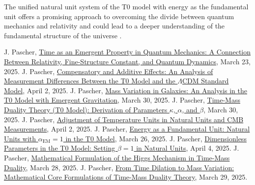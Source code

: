 \documentclass[12pt,a4paper]{article}
\newcommand{\alphaEM}{\alpha_{\text{EM}}}
\begin{document}
	The unified natural unit system of the T0 model with energy as the fundamental unit offers a promising approach to overcoming the divide between quantum mechanics and relativity and could lead to a deeper understanding of the fundamental structure of the universe \cite{pascher_vereinheitlichung_2025}.
	
	
	\begin{thebibliography}{99}
		 J. Pascher, \href{https://github.com/jpascher/T0-Time-Mass-Duality/tree/main/2/pdf/English/ZeitEmergentQMEn.pdf}{Time as an Emergent Property in Quantum Mechanics: A Connection Between Relativity, Fine-Structure Constant, and Quantum Dynamics}, March 23, 2025.
		 J. Pascher, \href{https://github.com/jpascher/T0-Time-Mass-Duality/tree/main/2/pdf/English/MessdifferenzenT0StandardEn.pdf}{Compensatory and Additive Effects: An Analysis of Measurement Differences Between the T0 Model and the $\Lambda$CDM Standard Model}, April 2, 2025.
		 J. Pascher, \href{https://github.com/jpascher/T0-Time-Mass-Duality/tree/main/2/pdf/English/MassVarGalaxienEn.pdf}{Mass Variation in Galaxies: An Analysis in the T0 Model with Emergent Gravitation}, March 30, 2025.
		 J. Pascher, \href{https://github.com/jpascher/T0-Time-Mass-Duality/tree/main/2/pdf/English/ZeitMasseT0ParamsEn.pdf}{Time-Mass Duality Theory (T0 Model): Derivation of Parameters $\kappa$, $\alpha$, and $\beta$}, March 30, 2025.
		 J. Pascher, \href{https://github.com/jpascher/T0-Time-Mass-Duality/tree/main/2/pdf/English/NatEinheitenAlpha1En.pdf}{Adjustment of Temperature Units in Natural Units and CMB Measurements}, April 2, 2025.
		 J. Pascher, \href{https://github.com/jpascher/T0-Time-Mass-Duality/tree/main/2/pdf/English/NatEinheitenAlpha1En.pdf}{Energy as a Fundamental Unit: Natural Units with $\alphaEM = 1$ in the T0 Model}, March 26, 2025.
		 J. Pascher, \href{https://github.com/jpascher/T0-Time-Mass-Duality/tree/main/2/pdf/English/Alpha1Beta1KonsistenzEn.pdf}{Dimensionless Parameters in the T0 Model: Setting $\beta = 1$ in Natural Units}, April 4, 2025.
		 J. Pascher, \href{https://github.com/jpascher/T0-Time-Mass-Duality/tree/main/2/pdf/English/MathHiggsZeitMasseEn.pdf}{Mathematical Formulation of the Higgs Mechanism in Time-Mass Duality}, March 28, 2025.
		 J. Pascher, \href{https://github.com/jpascher/T0-Time-Mass-Duality/tree/main/2/pdf/English/MathZeitMasseLagrangeEn.pdf}{From Time Dilation to Mass Variation: Mathematical Core Formulations of Time-Mass Duality Theory}, March 29, 2025.

\end{thebibliography}
\end{document}
